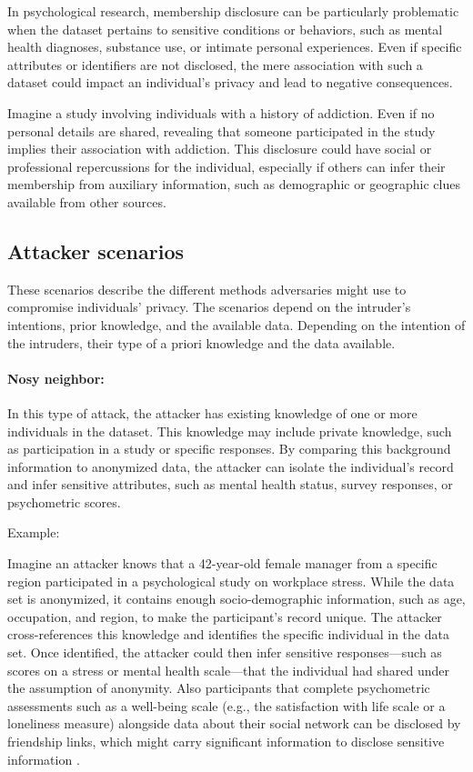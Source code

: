\documentclass{article}
\begin{document}
In psychological research, membership disclosure can be particularly problematic when the dataset pertains to sensitive conditions or behaviors, such as mental health diagnoses, substance use, or intimate personal experiences. Even if specific attributes or identifiers are not disclosed, the mere association with such a dataset could impact an individual’s privacy and lead to negative consequences.

Imagine a study involving individuals with a history of addiction. Even if no personal details are shared, revealing that someone participated in the study implies their association with addiction. This disclosure could have social or professional repercussions for the individual, especially if others can infer their membership from auxiliary information, such as demographic or geographic clues available from other sources.

\subsection{Attacker scenarios}

These scenarios describe the different methods adversaries might use to compromise individuals' privacy. The scenarios depend on the intruder's intentions, prior knowledge, and the available data.
Depending on the intention of the intruders, their type of a priori knowledge and the data available.

\paragraph{Nosy neighbor:}
\color{blue} %

In this type of attack, the attacker has existing knowledge of one or more individuals in the dataset. This knowledge may include  private knowledge, such as participation in a study or specific responses. By comparing this background information to anonymized data, the attacker can isolate the individual's record and infer sensitive attributes, such as mental health status, survey responses, or psychometric scores.

Example:

Imagine an attacker knows that a 42-year-old female manager from a specific region participated in a psychological study on workplace stress. While the data set is anonymized, it contains enough socio-demographic information, such as age, occupation, and region, to make the participant’s record unique. The attacker cross-references this knowledge and identifies the specific individual in the data set. Once identified, the attacker could then infer sensitive responses—such as scores on a stress or mental health scale—that the individual had shared under the assumption of anonymity.
Also participants that complete psychometric assessments such as a well-being scale (e.g., the satisfaction with life scale or a loneliness measure) alongside data about their social network can be disclosed by friendship links, which might carry significant information to disclose sensitive information \citep{Zheleva09}.
\end{document}
